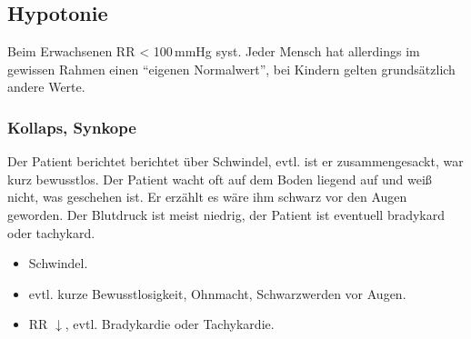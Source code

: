 \subsection{Hypotonie}

 
\noindent {} Beim Erwachsenen RR {\textless} 100\,mmHg
syst. Jeder Mensch hat allerdings im gewissen Rahmen einen
"`eigenen Normalwert"', bei Kindern gelten grundsätzlich
andere Werte.

% 
% 
% 
% 


\subsubsection{Kollaps, Synkope}


{ 
Der Patient berichtet berichtet über Schwindel, evtl. ist er zusammengesackt,
war kurz bewusstlos. Der Patient wacht oft auf dem Boden liegend auf und weiß
nicht, was geschehen ist. Er erzählt  es wäre ihm schwarz vor den Augen
geworden. Der Blutdruck ist meist niedrig, der Patient ist eventuell bradykard oder
tachykard. 
}{
\begin{itemize}
  \item Schwindel. 
  \item evtl. kurze Bewusstlosigkeit, Ohnmacht, Schwarzwerden vor Augen. 
  \item RR ${\downarrow}$, evtl. Bradykardie oder Tachykardie. 
\end{itemize}
}{}{}{}




